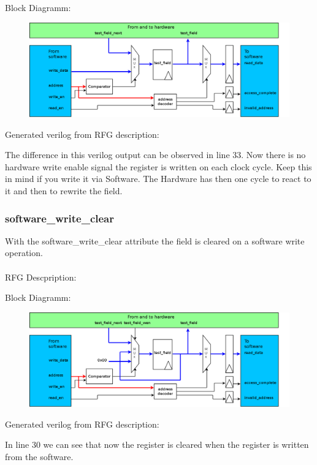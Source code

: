 \documentclass[12pt,a4paper]{article}
\begin{document}
Block Diagramm:
\begin{figure}[h!]
\includegraphics[width=\textwidth]{pictures/Reg_hrw_srw_nhwen.png}
\end{figure}
\newpage
Generated verilog from RFG description:

The difference in this verilog output can be observed in line 33. Now there is no hardware write enable signal the register is written on each clock cycle. Keep this in mind if you write it via Software. The Hardware has then one cycle to react to it and then to rewrite the field.
\newpage

\subsubsection{software\_write\_clear}
With the software\_write\_clear attribute the field is cleared on a software write operation.\\
\\
RFG Descpription:


Block Diagramm:
\begin{figure}[h!]
    \includegraphics[width=\textwidth]{pictures/Reg_hrw_srw_swrite_clear.png}
\end{figure}
\newpage
Generated verilog from RFG description:

In line 30 we can see that now the register is cleared when the register is written from the software.
\newpage
\end{document}

